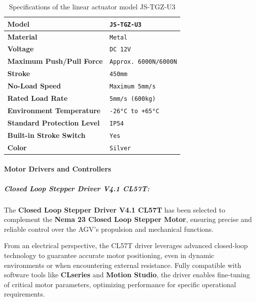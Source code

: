 \documentclass[../../main]{subfiles}
\begin{document}
\begin{table}[h!]
    \centering
    \begin{tabular}{|>{\bfseries}l|>{\ttfamily}l|} %
    \hline
    Model & \texttt{JS-TGZ-U3} \\ \hline
    Material & \texttt{Metal} \\ \hline
    Voltage & \texttt{DC 12V} \\ \hline
    Maximum Push/Pull Force & \texttt{Approx. 6000N/6000N} \\ \hline
    Stroke & \texttt{450mm} \\ \hline
    No-Load Speed & \texttt{Maximum 5mm/s} \\ \hline
    Rated Load Rate & \texttt{5mm/s (600kg)} \\ \hline
    Environment Temperature & \texttt{-26°C to +65°C} \\ \hline
    Standard Protection Level & \texttt{IP54} \\ \hline
    Built-in Stroke Switch & \texttt{Yes} \\ \hline
    Color & \texttt{Silver} \\ \hline
    \end{tabular}
    \caption{Specifications of the linear actuator model JS-TGZ-U3}
    \label{Linear Actuator Specifications} %
    
\end{table}




\paragraph{Motor Drivers and Controllers}


\subparagraph{Closed Loop Stepper Driver V4.1 CL57T:}

The \textbf{Closed Loop Stepper Driver V4.1 CL57T} has been selected 
to complement the \textbf{Nema 23 Closed Loop Stepper Motor}, 
ensuring precise and reliable control over the AGV's propulsion and mechanical functions. 

From an electrical perspective, the CL57T driver leverages 
advanced closed-loop technology to guarantee accurate motor positioning, 
even in dynamic environments or when encountering external resistance. 
Fully compatible with software tools like \textbf{CLseries} and \textbf{Motion Studio}, 
the driver enables fine-tuning of critical motor parameters, optimizing performance 
for specific operational requirements. 
\end{document}
